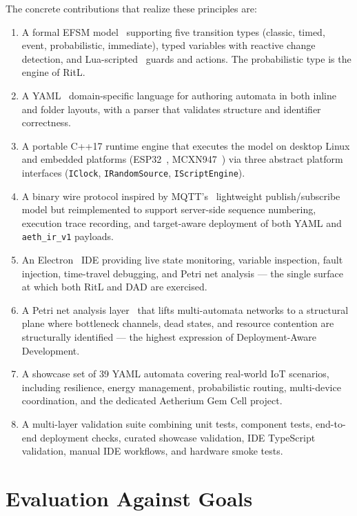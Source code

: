 The concrete contributions that realize these principles are:
\begin{enumerate}
  \item A formal EFSM model~\cite{Harel1987} supporting five transition types (classic, timed, event, probabilistic, immediate), typed variables with reactive change detection, and Lua-scripted~\cite{Lua1996} guards and actions. The probabilistic type is the engine of RitL.
  \item A YAML~\cite{YAML122} domain-specific language for authoring automata in both inline and folder layouts, with a parser that validates structure and identifier correctness.
  \item A portable C++17 runtime engine that executes the model on desktop Linux and embedded platforms (ESP32~\cite{ESP32TRM}, MCXN947~\cite{NXPFRDMMCXN947}) via three abstract platform interfaces (\texttt{IClock}, \texttt{IRandomSource}, \texttt{IScriptEngine}).
	  \item A binary wire protocol inspired by MQTT's~\cite{MQTT} lightweight publish/subscribe model but reimplemented to support server-side sequence numbering, execution trace recording, and target-aware deployment of both YAML and \texttt{aeth\_ir\_v1} payloads.
  \item An Electron~\cite{Electron} IDE providing live state monitoring, variable inspection, fault injection, time-travel debugging, and Petri net analysis --- the single surface at which both RitL and DAD are exercised.
	  \item A Petri net analysis layer~\cite{Murata1989} that lifts multi-automata networks to a structural plane where bottleneck channels, dead states, and resource contention are structurally identified --- the highest expression of Deployment-Aware Development.
	  \item A showcase set of 39 YAML automata covering real-world IoT scenarios, including resilience, energy management, probabilistic routing, multi-device coordination, and the dedicated Aetherium Gem Cell project.
	  \item A multi-layer validation suite combining unit tests, component tests, end-to-end deployment checks, curated showcase validation, IDE TypeScript validation, manual IDE workflows, and hardware smoke tests.
	\end{enumerate}

\section{Evaluation Against Goals}
\label{sec:goal-evaluation}

